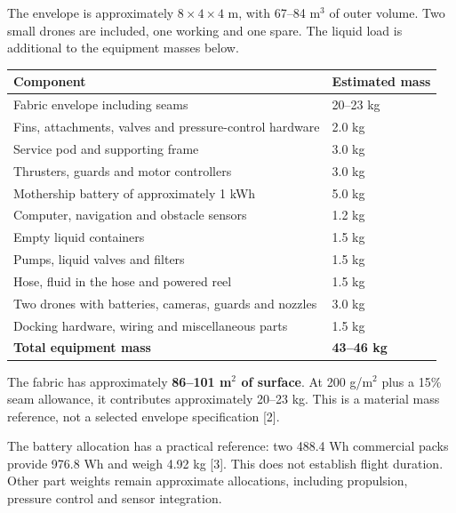 \documentclass[11pt,letterpaper]{article}
\newcommand{\sectiontitle}[1]{\par\vspace{8pt}{\large\bfseries #1}\par\vspace{3pt}}
\begin{document}
\newpage
\sectiontitle{Parts budget for the 8 metre version}
The envelope is approximately $8 \times 4 \times 4$ m, with 67--84 m$^3$ of outer volume. Two small drones are included, one working and one spare. The liquid load is additional to the equipment masses below.

\begin{tabularx}{\textwidth}{|Y|C{1.20in}|}
\hline
{}\textbf{Component} & \textbf{Estimated mass}\\
\hline
Fabric envelope including seams & 20--23 kg\\
\hline
Fins, attachments, valves and pressure-control hardware & 2.0 kg\\
\hline
Service pod and supporting frame & 3.0 kg\\
\hline
Thrusters, guards and motor controllers & 3.0 kg\\
\hline
Mothership battery of approximately 1 kWh & 5.0 kg\\
\hline
Computer, navigation and obstacle sensors & 1.2 kg\\
\hline
Empty liquid containers & 1.5 kg\\
\hline
Pumps, liquid valves and filters & 1.5 kg\\
\hline
Hose, fluid in the hose and powered reel & 1.5 kg\\
\hline
Two drones with batteries, cameras, guards and nozzles & 3.0 kg\\
\hline
Docking hardware, wiring and miscellaneous parts & 1.5 kg\\
\hline
{}\textbf{Total equipment mass} & \textbf{43--46 kg}\\
\hline
\end{tabularx}

The fabric has approximately \textbf{86--101 m$^2$ of surface}. At 200 g/m$^2$ plus a 15\% seam allowance, it contributes approximately 20--23 kg. This is a material mass reference, not a selected envelope specification [2].

The battery allocation has a practical reference: two 488.4 Wh commercial packs provide 976.8 Wh and weigh 4.92 kg [3]. This does not establish flight duration. Other part weights remain approximate allocations, including propulsion, pressure control and sensor integration.
\end{document}
